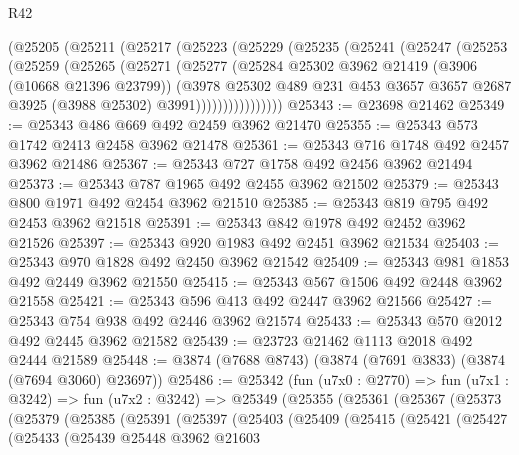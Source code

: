 \begin{lexlean}{R42}
\begin{coremodule}
      (@25205
        (@25211
          (@25217
            (@25223
              (@25229
                (@25235
                  (@25241
                    (@25247
                      (@25253
                        (@25259
                          (@25265
                            (@25271
                              (@25277
                                (@25284
                                  @25302
                                  @3962
                                  @21419
                                  (@3906 (@10668 @21396 @23799))
                                  (@3978
                                    @25302
                                    @489
                                    @231
                                    @453
                                    @3657
                                    @3657
                                    @2687
                                    @3925
                                    (@3988 @25302)
                                    @3991))))))))))))))))
@25343 := @23698 @21462
@25349 := @25343 @486 @669 @492 @2459 @3962 @21470
@25355 := @25343 @573 @1742 @2413 @2458 @3962 @21478
@25361 := @25343 @716 @1748 @492 @2457 @3962 @21486
@25367 := @25343 @727 @1758 @492 @2456 @3962 @21494
@25373 := @25343 @787 @1965 @492 @2455 @3962 @21502
@25379 := @25343 @800 @1971 @492 @2454 @3962 @21510
@25385 := @25343 @819 @795 @492 @2453 @3962 @21518
@25391 := @25343 @842 @1978 @492 @2452 @3962 @21526
@25397 := @25343 @920 @1983 @492 @2451 @3962 @21534
@25403 := @25343 @970 @1828 @492 @2450 @3962 @21542
@25409 := @25343 @981 @1853 @492 @2449 @3962 @21550
@25415 := @25343 @567 @1506 @492 @2448 @3962 @21558
@25421 := @25343 @596 @413 @492 @2447 @3962 @21566
@25427 := @25343 @754 @938 @492 @2446 @3962 @21574
@25433 := @25343 @570 @2012 @492 @2445 @3962 @21582
@25439 := @23723 @21462 @1113 @2018 @492 @2444 @21589
@25448 := @3874 (@7688 @8743) (@3874 (@7691 @3833) (@3874 (@7694 @3060) @23697))
@25486 := @25342
    (fun (u7x0 : @2770) =>
    fun (u7x1 : @3242) =>
    fun (u7x2 : @3242) =>
    @25349
      (@25355
        (@25361
          (@25367
            (@25373
              (@25379
                (@25385
                  (@25391
                    (@25397
                      (@25403
                        (@25409
                          (@25415
                            (@25421
                              (@25427
                                (@25433
                                  (@25439
                                    @25448
                                    @3962
                                    @21603

\end{coremodule}
\end{lexlean}
